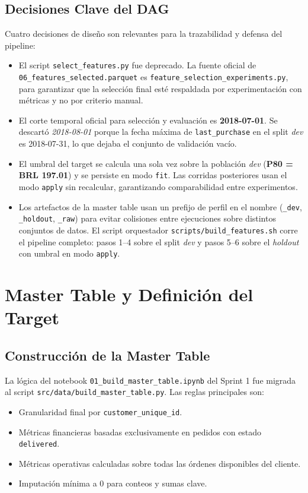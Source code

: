 \documentclass[journal,letterpaper]{IEEEtran}
\begin{document}
\subsection{Decisiones Clave del DAG}
Cuatro decisiones de diseño son relevantes para la trazabilidad y defensa del pipeline:
\begin{itemize}
    \item El script \texttt{select\_features.py} fue deprecado. La fuente oficial de \texttt{06\_features\_selected.parquet} es \texttt{feature\_selection\_experiments.py}, para garantizar que la selección final esté respaldada por experimentación con métricas y no por criterio manual.
    \item El corte temporal oficial para selección y evaluación es \textbf{2018-07-01}. Se descartó \textit{2018-08-01} porque la fecha máxima de \texttt{last\_purchase} en el split \textit{dev} es 2018-07-31, lo que dejaba el conjunto de validación vacío.
    \item El umbral del target se calcula una sola vez sobre la población \textit{dev} (\textbf{P80 = BRL 197.01}) y se persiste en modo \texttt{fit}. Las corridas posteriores usan el modo \texttt{apply} sin recalcular, garantizando comparabilidad entre experimentos.
    \item Los artefactos de la master table usan un prefijo de perfil en el nombre (\texttt{\_dev}, \texttt{\_holdout}, \texttt{\_raw}) para evitar colisiones entre ejecuciones sobre distintos conjuntos de datos. El script orquestador \texttt{scripts/build\_features.sh} corre el pipeline completo: pasos 1--4 sobre el split \textit{dev} y pasos 5--6 sobre el \textit{holdout} con umbral en modo \texttt{apply}.
\end{itemize}

\section{Master Table y Definición del Target}
\subsection{Construcción de la Master Table}
La lógica del notebook \texttt{01\_build\_master\_table.ipynb} del Sprint 1 fue migrada al script \texttt{src/data/build\_master\_table.py}. Las reglas principales son:
\begin{itemize}
    \item Granularidad final por \texttt{customer\_unique\_id}.
    \item Métricas financieras basadas exclusivamente en pedidos con estado \texttt{delivered}.
    \item Métricas operativas calculadas sobre todas las órdenes disponibles del cliente.
    \item Imputación mínima a 0 para conteos y sumas clave.
\end{itemize}
\end{document}
